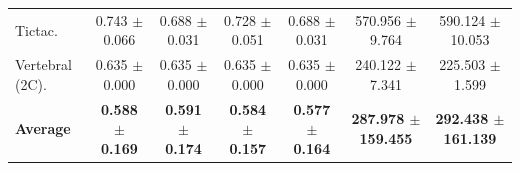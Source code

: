 \begin{table}[t]
{\begin{tabular}{lcccccc}
Tictac. & 0.743 $\pm$ 0.066 & 0.688 $\pm$ 0.031 & 0.728 $\pm$ 0.051 & 0.688 $\pm$ 0.031 & 570.956 $\pm$ 9.764 & 590.124 $\pm$ 10.053 \\
Vertebral (2C). & 0.635 $\pm$ 0.000 & 0.635 $\pm$ 0.000 & 0.635 $\pm$ 0.000 & 0.635 $\pm$ 0.000 & 240.122 $\pm$ 7.341 & 225.503 $\pm$ 1.599 \\
\midrule
\textbf{Average} & \textbf{0.588 $\pm$ 0.169} & \textbf{0.591 $\pm$ 0.174} & \textbf{0.584 $\pm$ 0.157} & \textbf{0.577 $\pm$ 0.164} & \textbf{287.978 $\pm$ 159.455} & \textbf{292.438 $\pm$ 161.139} \\
\bottomrule
\end{tabular}%
}
\end{table}
